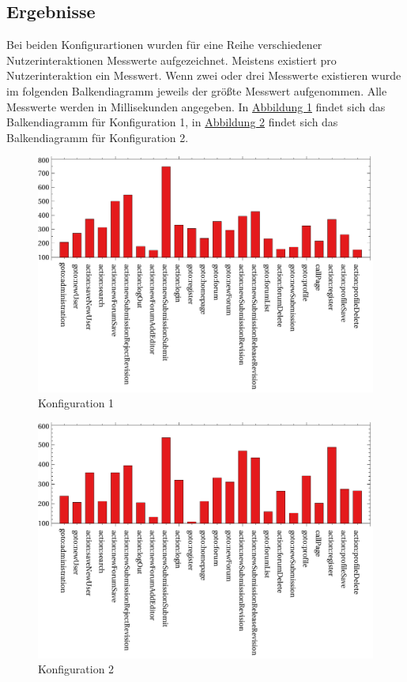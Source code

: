 \subsection{Ergebnisse}

Bei beiden Konfigurartionen wurden für eine Reihe verschiedener Nutzerinteraktionen Messwerte aufgezeichnet. Meistens existiert pro Nutzerinteraktion ein Messwert. Wenn zwei oder drei Messwerte existieren wurde im folgenden Balkendiagramm jeweils der größte Messwert aufgenommen. Alle Messwerte werden in Millisekunden angegeben. In \hyperref[fig:worst30]{Abbildung 1} findet sich das Balkendiagramm für Konfiguration 1, in \hyperref[fig:worst50]{Abbildung 2} findet sich das Balkendiagramm für Konfiguration 2.

\begin{figure}[H]
	\includegraphics[width=\linewidth]{graphics/30worstcase.pdf}
	\caption{Konfiguration 1}
	\label{fig:worst30}	
\end{figure}
\begin{figure}[H]
	\includegraphics[width=\linewidth]{graphics/50worstcase.pdf}
	\caption{Konfiguration 2}
	\label{fig:worst50}	
\end{figure}

